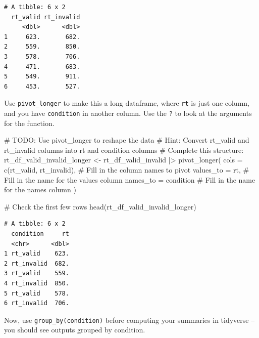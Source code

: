 \documentclass[
  letterpaper,
  DIV=11,
  numbers=noendperiod]{scrartcl}
\newenvironment{Shaded}{\begin{snugshade}}{\end{snugshade}}
\newcommand{\AlertTok}[1]{\textcolor[rgb]{0.68,0.00,0.00}{#1}}
\newcommand{\AttributeTok}[1]{\textcolor[rgb]{0.40,0.45,0.13}{#1}}
\newcommand{\CommentTok}[1]{\textcolor[rgb]{0.37,0.37,0.37}{#1}}
\newcommand{\FunctionTok}[1]{\textcolor[rgb]{0.28,0.35,0.67}{#1}}
\newcommand{\NormalTok}[1]{\textcolor[rgb]{0.00,0.23,0.31}{#1}}
\newcommand{\OtherTok}[1]{\textcolor[rgb]{0.00,0.23,0.31}{#1}}
\newcommand{\SpecialCharTok}[1]{\textcolor[rgb]{0.37,0.37,0.37}{#1}}
\newcommand{\StringTok}[1]{\textcolor[rgb]{0.13,0.47,0.30}{#1}}
\begin{document}
\begin{verbatim}
# A tibble: 6 x 2
  rt_valid rt_invalid
     <dbl>      <dbl>
1     623.       682.
2     559.       850.
3     578.       706.
4     471.       683.
5     549.       911.
6     453.       527.
\end{verbatim}

Use \texttt{pivot\_longer} to make this a long dataframe, where
\texttt{rt} is just one column, and you have \texttt{condition} in
another column. Use the \texttt{?} to look at the arguments for the
function.

\begin{Shaded}
\begin{Highlighting}[]
\CommentTok{\# }\AlertTok{TODO}\CommentTok{: Use pivot\_longer to reshape the data}
\CommentTok{\# Hint: Convert rt\_valid and rt\_invalid columns into rt and condition columns}
\CommentTok{\# Complete this structure:}
\NormalTok{rt\_df\_valid\_invalid\_longer }\OtherTok{\textless{}{-}}\NormalTok{ rt\_df\_valid\_invalid }\SpecialCharTok{|\textgreater{}}
  \FunctionTok{pivot\_longer}\NormalTok{(}
    \AttributeTok{cols =} \FunctionTok{c}\NormalTok{(}\StringTok{\textquotesingle{}rt\_valid\textquotesingle{}}\NormalTok{, }\StringTok{\textquotesingle{}rt\_invalid\textquotesingle{}}\NormalTok{),        }\CommentTok{\# Fill in the column names to pivot}
    \AttributeTok{values\_to =} \StringTok{\textquotesingle{}rt\textquotesingle{}}\NormalTok{,           }\CommentTok{\# Fill in the name for the values column}
    \AttributeTok{names\_to =} \StringTok{\textquotesingle{}condition\textquotesingle{}}             \CommentTok{\# Fill in the name for the names column}
\NormalTok{  )}

\CommentTok{\# Check the first few rows}
\FunctionTok{head}\NormalTok{(rt\_df\_valid\_invalid\_longer)}
\end{Highlighting}
\end{Shaded}

\begin{verbatim}
# A tibble: 6 x 2
  condition     rt
  <chr>      <dbl>
1 rt_valid    623.
2 rt_invalid  682.
3 rt_valid    559.
4 rt_invalid  850.
5 rt_valid    578.
6 rt_invalid  706.
\end{verbatim}

Now, use \texttt{group\_by(condition)} before computing your summaries
in tidyverse -- you should see outputs grouped by condition.
\end{document}
